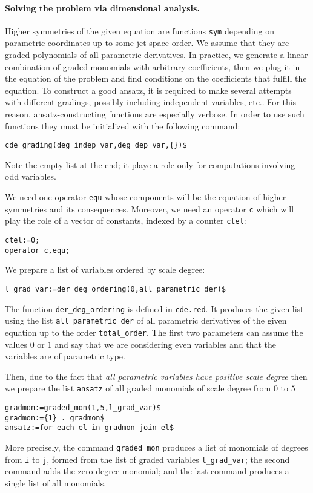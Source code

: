 \paragraph*{Solving the problem via dimensional analysis.}
\label{cdesec:solving-problem-via}
Higher symmetries of the given equation are functions \texttt{sym} depending on
parametric coordinates up to some jet space order. We assume that they are
graded polynomials of all parametric derivatives. In practice, we generate a
linear combination of graded monomials with arbitrary coefficients, then we
plug it in the equation of the problem and find conditions on the coefficients
that fulfill the equation.  To construct a good ansatz, it is required to make
several attempts with different gradings, possibly including independent
variables, etc.. For this reason, ansatz-constructing functions are especially
verbose.  In order to use such functions they must be initialized with the
following command:
\begin{verbatim}
cde_grading(deg_indep_var,deg_dep_var,{})$
\end{verbatim}
Note the empty list at the end; it playe a role only for computations involving
odd variables.

We need one operator \texttt{equ} whose components will be the equation of
higher symmetries and its consequences. Moreover, we need an operator
\texttt{c} which will play the role of a vector of constants, indexed by a
counter \texttt{ctel}:
\begin{verbatim}
ctel:=0;
operator c,equ;
\end{verbatim}
We prepare a list of variables ordered by scale degree:
\begin{verbatim}
l_grad_var:=der_deg_ordering(0,all_parametric_der)$
\end{verbatim}
The function \texttt{der\_deg\_ordering} is defined in \texttt{cde.red}. It
produces the given list using the list \texttt{all\_parametric\_der} of all
parametric derivatives of the given equation up to the order
\texttt{total\_order}. The first two parameters can assume the values $0$ or $1$
and say that we are considering even variables and that the variables are of
parametric type.

Then, due to the fact that \emph{all parametric
  variables have positive scale degree} then we prepare the list
\texttt{ansatz} of all graded monomials of scale degree from $0$ to $5$
\begin{verbatim}
gradmon:=graded_mon(1,5,l_grad_var)$
gradmon:={1} . gradmon$
ansatz:=for each el in gradmon join el$
\end{verbatim}
More precisely, the command \texttt{graded\_mon} produces a list of monomials
of degrees from \texttt{i} to \texttt{j}, formed from the list of graded
variables \texttt{l\_grad\_var}; the second command adds the zero-degree
monomial; and the last command produces a single list of all monomials.

